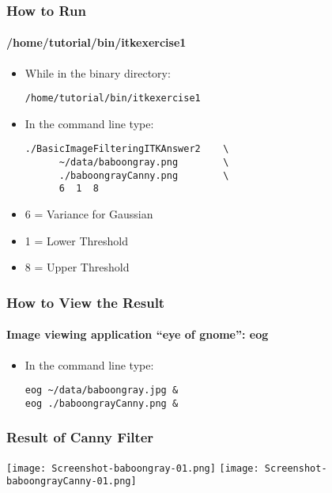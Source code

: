 \begin{frame}[fragile]
\frametitle{How to Run}
\framesubtitle{/home/tutorial/bin/itkexercise1}
\begin{itemize}
\item While in the binary directory:
\begin{verbatim}
/home/tutorial/bin/itkexercise1
\end{verbatim}
\pause
\item In the command line type:
\begin{verbatim}
./BasicImageFilteringITKAnswer2    \
      ~/data/baboongray.png        \
      ./baboongrayCanny.png        \
      6  1  8
\end{verbatim}
\pause
\item 6 = Variance for Gaussian
\item 1 = Lower Threshold
\item 8 = Upper Threshold
\end{itemize}
\end{frame}

\begin{frame}[fragile]
\frametitle{How to View the Result}
\framesubtitle{Image viewing application ``eye of gnome'': eog}
\begin{itemize}
\item In the command line type:
\begin{verbatim}
eog ~/data/baboongray.jpg &
eog ./baboongrayCanny.png &
\end{verbatim}
\end{itemize}
\end{frame}

\begin{frame}[fragile]
\frametitle{Result of Canny Filter}
\begin{center}
  \texttt{[image: Screenshot-baboongray-01.png]}
  \texttt{[image: Screenshot-baboongrayCanny-01.png]}
\end{center}
\end{frame}

